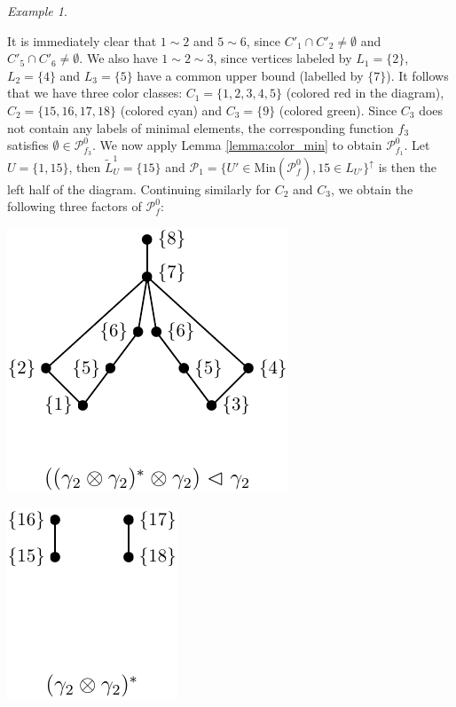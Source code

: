 \documentclass[12pt]{article}
\theoremstyle{definition}
\theoremstyle{remark}
\newtheorem{exm}{Example}
\def\Pe{\mathcal P}
\begin{document}
\begin{exm}
\begin{center}
\end{center}
It is immediately clear that $1\sim 2$ and $5\sim 6$, since $C'_1\cap C'_2\ne \emptyset$
and $C'_5\cap C'_6\ne \emptyset$. We also have $1\sim 2\sim 3$, since vertices labeled by $L_1=\{2\}$,
$L_2=\{4\}$ and $L_3=\{5\}$ have a common upper bound (labelled by $\{7\}$). It follows
that we have three color classes: $C_1=\{1,2,3,4,5\}$ (colored red in the diagram),
$C_2=\{15,16,17,18\}$ (colored cyan) and $C_3=\{9\}$ (colored green). Since $C_3$ does not
contain any labels of minimal elements, the corresponding function $f_3$ satisfies
$\emptyset \in \Pe_{f_3}^0$. We now apply Lemma \ref{lemma:color_min} to obtain
$\Pe_{f_1}^0$. Let $U=\{1,15\}$, then $\tilde L^1_U=\{15\}$ and $\Pe_1=\{U'\in
\mathrm{Min}(\Pe_f^0), 15\in L_{U'}\}^\uparrow$ is then the left half of the diagram. 
Continuing similarly for $C_2$ and $C_3$, we obtain the following three factors of
$\Pe_f^0$:
\begin{center}
\begin{minipage}[b]{0.3\textwidth}
\centering
\includegraphics[scale=0.9]{product1.pdf}
\end{minipage}
\begin{minipage}[b]{0.3\textwidth}
\centering
\includegraphics[scale=0.9]{product2.pdf}

\end{minipage}
\end{center}
\end{exm}
\end{document}

